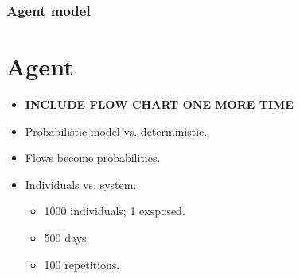 \documentclass[30pt]{beamer}
\begin{document}
\begin{frame}
\frametitle{Agent model}
\section{Agent}
%
%      
%       
\begin{itemize}
\item \textbf{INCLUDE FLOW CHART ONE MORE TIME}
\item Probabilistic model vs. deterministic.
\item Flows become probabilities.
\item Individuals vs. system.
\begin{itemize}
\item 1000 individuals; 1 exsposed.
\item 500 days.
\item 100 repetitions.
\end{itemize}
\end{itemize}
\end{frame}
\end{document}
